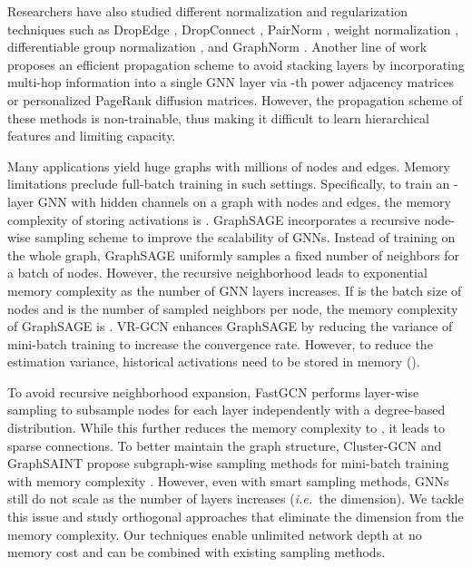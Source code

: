 \documentclass{article}
\newcommand{\ie}{\emph{i.e.~}}
\begin{document}
Researchers have also studied different normalization and regularization techniques such as DropEdge \citep{rong2020dropedge}, DropConnect \citep{hasanzadeh2020bayesian}, PairNorm \citep{zhao2019pairnorm}, weight normalization \citep{oono2019graph}, differentiable group normalization \citep{zhou2020towards}, and GraphNorm \citep{cai2020graphnorm}. Another line of work \citep{wu2019simplifying,klicpera_predict_2019,bojchevski2020scaling,liu2020towards,sign_icml_grl2020} proposes an efficient propagation scheme to avoid stacking layers by incorporating multi-hop information into a single GNN layer via -th power adjacency matrices or personalized PageRank diffusion matrices. However, the propagation scheme of these methods is non-trainable, thus making it difficult to learn hierarchical features and  limiting capacity.

Many applications yield huge graphs with millions of nodes and edges. Memory limitations preclude full-batch training in such settings. Specifically, to train an -layer GNN with  hidden channels on a graph  with  nodes and  edges, the memory complexity of storing activations is . GraphSAGE \citep{hamilton2017inductive} incorporates a recursive node-wise sampling scheme to improve the scalability of GNNs. Instead of training on the whole graph, GraphSAGE uniformly samples a fixed number of neighbors for a batch of nodes. However, the recursive neighborhood leads to exponential memory complexity as the number of GNN layers increases. If  is the batch size of nodes and  is the number of sampled neighbors per node, the memory complexity of GraphSAGE is . VR-GCN \citep{chen2018stochastic} enhances GraphSAGE by reducing the variance of mini-batch training to increase the convergence rate. However, to reduce the estimation variance, historical activations need to be stored in memory (). 

To avoid recursive neighborhood expansion, FastGCN \citep{chen2018fastgcn} performs layer-wise sampling to subsample nodes for each layer independently with a degree-based distribution. While this further reduces the memory complexity to , it leads to sparse connections.
To better maintain the graph structure, Cluster-GCN \citep{chiang2019cluster} and GraphSAINT \citep{graphsaint-iclr20} propose subgraph-wise sampling methods for mini-batch training with memory complexity . However, even with smart sampling methods, GNNs still do not scale as the number of layers increases (\ie the  dimension). We tackle this issue and study orthogonal approaches that eliminate the  dimension from the memory complexity. Our techniques enable unlimited network depth at no memory cost and can be combined with existing sampling methods.
\end{document}
